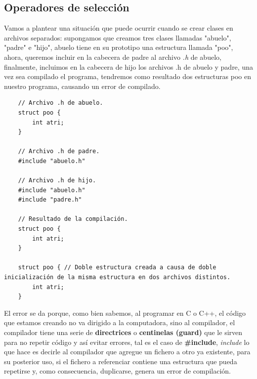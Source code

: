 \subsection{Operadores de selección}
\hspace{0.55cm}Vamos a plantear una situación que puede ocurrir cuando se crear clases en archivos separados: supongamos que creamos tres clases llamadas "abuelo", "padre" e "hijo", abuelo tiene en su prototipo una estructura llamada "poo", ahora, queremos incluir en la cabecera de padre al archivo \textit{.h} de abuelo, finalmente, incluimos en la cabecera de hijo los archivos .h de abuelo y padre, una vez sea compilado el programa, tendremos como resultado dos estructuras poo en nuestro programa, causando un error de compilado.
\begin{lstlisting}
    // Archivo .h de abuelo.
    struct poo {
        int atri;
    }
    
    // Archivo .h de padre.
    #include "abuelo.h"
    
    // Archivo .h de hijo.
    #include "abuelo.h"
    #include "padre.h"
    
    // Resultado de la compilación.
    struct poo {
        int atri;
    }
    
    struct poo { // Doble estructura creada a causa de doble inicialización de la misma estructura en dos archivos distintos.
        int atri;
    }
\end{lstlisting}

El error se da porque, como bien sabemos, al programar en C o C++, el código que estamos creando no va dirigido a la computadora, sino al compilador, el compilador tiene una serie de \textbf{directrices} o \textbf{centinelas (guard)} que le sirven para no repetir código y así evitar errores, tal es el caso de \textbf{\#include}, \textit{include} lo que hace es decirle al compilador que agregue un fichero a otro ya existente, para su posterior uso, si el fichero a referenciar contiene una estructura que pueda repetirse y, como consecuencia, duplicarse, genera un error de compilación.

